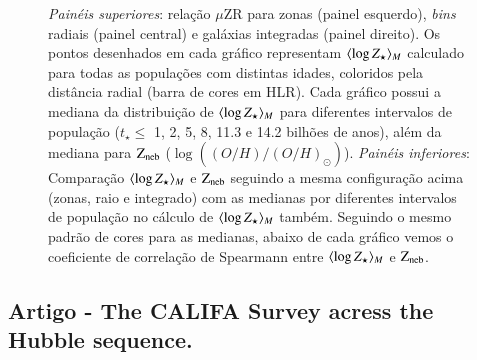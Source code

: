 \begin{figure}
	\centering
	\caption[Relação $\mu$ZR e comparação entre as metalicidades.]
	{\emph{Painéis superiores}: relação $\mu$ZR para zonas (painel esquerdo), {\em bins} radiais
(painel central) e galáxias integradas (painel direito). Os pontos desenhados em cada gráfico
representam $\meanM{\log Z_\star}$ calculado para todas as populações com distintas idades,
coloridos pela distância radial (barra de cores em HLR). Cada gráfico possui a mediana da
distribuição de $\meanM{\log Z_\star}$ para diferentes intervalos de população ($t_\star \leq$ 1,
2, 5, 8, 11.3 e 14.2 bilhões de anos), além da mediana para $\mathrm{Z}_{\mathrm{neb}}$
($\log\left((O/H)/(O/H)_\odot\right)$). \emph{Painéis inferiores}: Comparação $\meanM{\log Z_\star}$
e $\mathrm{Z}_{\mathrm{neb}}$ seguindo a mesma configuração acima (zonas, raio e integrado) com as medianas por diferentes
intervalos de população no cálculo de $\meanM{\log Z_\star}$ também. Seguindo o mesmo padrão de
cores para as medianas, abaixo de cada gráfico vemos o coeficiente de correlação de Spearmann entre
$\meanM{\log Z_\star}$ e $\mathrm{Z}_{\mathrm{neb}}$.}
	\label{fig:ZstarvsZneb}
\end{figure}

\subsection{Artigo - The CALIFA Survey acress the Hubble sequence.}


